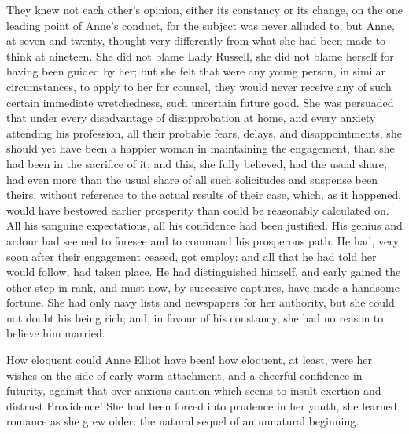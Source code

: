 They knew not each other's opinion, either its constancy or its change, on the one leading point of Anne's conduct, for the subject was never alluded to; but Anne, at seven-and-twenty, thought very differently from what she had been made to think at nineteen. She did not blame Lady Russell, she did not blame herself for having been guided by her; but she felt that were any young person, in similar circumstances, to apply to her for counsel, they would never receive any of such certain immediate wretchedness, such uncertain future good. She was persuaded that under every disadvantage of disapprobation at home, and every anxiety attending his profession, all their probable fears, delays, and disappointments, she should yet have been a happier woman in maintaining the engagement, than she had been in the sacrifice of it; and this, she fully believed, had the usual share, had even more than the usual share of all such solicitudes and suspense been theirs, without reference to the actual results of their case, which, as it happened, would have bestowed earlier prosperity than could be reasonably calculated on. All his sanguine expectations, all his confidence had been justified. His genius and ardour had seemed to foresee and to command his prosperous path. He had, very soon after their engagement ceased, got employ: and all that he had told her would follow, had taken place. He had distinguished himself, and early gained the other step in rank, and must now, by successive captures, have made a handsome fortune. She had only navy lists and newspapers for her authority, but she could not doubt his being rich; and, in favour of his constancy, she had no reason to believe him married.

How eloquent could Anne Elliot have been! how eloquent, at least, were her wishes on the side of early warm attachment, and a cheerful confidence in futurity, against that over-anxious caution which seems to insult exertion and distrust Providence! She had been forced into prudence in her youth, she learned romance as she grew older: the natural sequel of an unnatural beginning.

